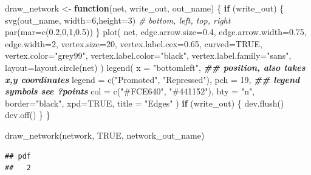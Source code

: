 \documentclass[
]{book}
\newenvironment{Shaded}{\begin{snugshade}}{\end{snugshade}}
\newcommand{\AttributeTok}[1]{\textcolor[rgb]{0.77,0.63,0.00}{#1}}
\newcommand{\CommentTok}[1]{\textcolor[rgb]{0.56,0.35,0.01}{\textit{#1}}}
\newcommand{\ConstantTok}[1]{\textcolor[rgb]{0.00,0.00,0.00}{#1}}
\newcommand{\ControlFlowTok}[1]{\textcolor[rgb]{0.13,0.29,0.53}{\textbf{#1}}}
\newcommand{\DecValTok}[1]{\textcolor[rgb]{0.00,0.00,0.81}{#1}}
\newcommand{\DocumentationTok}[1]{\textcolor[rgb]{0.56,0.35,0.01}{\textbf{\textit{#1}}}}
\newcommand{\FloatTok}[1]{\textcolor[rgb]{0.00,0.00,0.81}{#1}}
\newcommand{\FunctionTok}[1]{\textcolor[rgb]{0.00,0.00,0.00}{#1}}
\newcommand{\NormalTok}[1]{#1}
\newcommand{\OtherTok}[1]{\textcolor[rgb]{0.56,0.35,0.01}{#1}}
\newcommand{\StringTok}[1]{\textcolor[rgb]{0.31,0.60,0.02}{#1}}
\begin{document}
\begin{Shaded}
\begin{Highlighting}[]
\NormalTok{draw\_network }\OtherTok{\textless{}{-}} \ControlFlowTok{function}\NormalTok{(net, write\_out, out\_name) \{}
  \ControlFlowTok{if}\NormalTok{ (write\_out) \{}
    \FunctionTok{svg}\NormalTok{(out\_name, }\AttributeTok{width=}\DecValTok{6}\NormalTok{,}\AttributeTok{height=}\DecValTok{3}\NormalTok{)}
    \CommentTok{\# bottom, left, top, right}
    \FunctionTok{par}\NormalTok{(}\AttributeTok{mar=}\FunctionTok{c}\NormalTok{(}\FloatTok{0.2}\NormalTok{,}\DecValTok{0}\NormalTok{,}\DecValTok{1}\NormalTok{,}\FloatTok{0.5}\NormalTok{))}
\NormalTok{  \}}
  \FunctionTok{plot}\NormalTok{(}
\NormalTok{    net,}
    \AttributeTok{edge.arrow.size=}\FloatTok{0.4}\NormalTok{,}
    \AttributeTok{edge.arrow.width=}\FloatTok{0.75}\NormalTok{,}
    \AttributeTok{edge.width=}\DecValTok{2}\NormalTok{,}
    \AttributeTok{vertex.size=}\DecValTok{20}\NormalTok{,}
    \AttributeTok{vertex.label.cex=}\FloatTok{0.65}\NormalTok{,}
    \AttributeTok{curved=}\ConstantTok{TRUE}\NormalTok{,}
    \AttributeTok{vertex.color=}\StringTok{"grey99"}\NormalTok{,}
    \AttributeTok{vertex.label.color=}\StringTok{"black"}\NormalTok{,}
    \AttributeTok{vertex.label.family=}\StringTok{"sans"}\NormalTok{,}
    \AttributeTok{layout=}\FunctionTok{layout.circle}\NormalTok{(net)}
\NormalTok{  )}
  \FunctionTok{legend}\NormalTok{(}
    \AttributeTok{x =} \StringTok{"bottomleft"}\NormalTok{,      }\DocumentationTok{\#\# position, also takes x,y coordinates}
    \AttributeTok{legend =} \FunctionTok{c}\NormalTok{(}\StringTok{"Promoted"}\NormalTok{, }\StringTok{"Repressed"}\NormalTok{),}
    \AttributeTok{pch =} \DecValTok{19}\NormalTok{,              }\DocumentationTok{\#\# legend symbols see ?points}
    \AttributeTok{col =} \FunctionTok{c}\NormalTok{(}\StringTok{"\#FCE640"}\NormalTok{, }\StringTok{"\#441152"}\NormalTok{),}
    \AttributeTok{bty =} \StringTok{"n"}\NormalTok{,}
    \AttributeTok{border=}\StringTok{"black"}\NormalTok{,}
    \AttributeTok{xpd=}\ConstantTok{TRUE}\NormalTok{,}
    \AttributeTok{title =} \StringTok{"Edges"}
\NormalTok{  )}
  \ControlFlowTok{if}\NormalTok{ (write\_out) \{}
    \FunctionTok{dev.flush}\NormalTok{()}
    \FunctionTok{dev.off}\NormalTok{()}
\NormalTok{  \}}
\NormalTok{\}}

\FunctionTok{draw\_network}\NormalTok{(network, }\ConstantTok{TRUE}\NormalTok{, network\_out\_name)}
\end{Highlighting}
\end{Shaded}

\begin{verbatim}
## pdf 
##   2
\end{verbatim}
\end{document}

